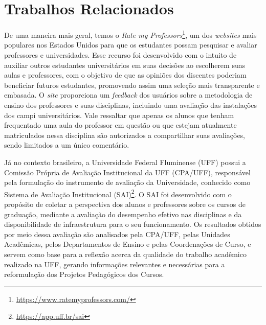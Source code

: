 

\section{Trabalhos Relacionados}
\label{sec:trab_relacionados}

De uma maneira mais geral, temos o 
\textit{Rate my Professors}\footnote{\url{https://www.ratemyprofessors.com/}}, 
um dos \textit{websites} mais populares nos Estados Unidos para que os estudantes possam pesquisar e avaliar professores e universidades. Esse recurso foi desenvolvido com o intuito de auxiliar outros estudantes universitários em suas decisões ao escolherem suas aulas e professores, com o objetivo de que as opiniões dos discentes poderiam beneficiar futuros estudantes, promovendo assim uma seleção mais transparente e embasada. O \textit{site} proporciona um \textit{feedback} dos usuários sobre a metodologia de ensino dos professores e suas disciplinas, incluindo uma avaliação das instalações dos campi universitários. Vale ressaltar que apenas os alunos que tenham frequentado uma aula do professor em questão ou que estejam atualmente matriculados nessa disciplina são autorizados a compartilhar suas avaliações, sendo limitados a um único comentário.


Já no contexto brasileiro, a Universidade Federal Fluminense (UFF) possui a Comissão Própria de Avaliação Institucional da UFF (CPA/UFF),
responsável pela formulação do instrumento de avaliação da Universidade, conhecido como Sistema de Avaliação Institucional (SAI)\footnote{\url{https://app.uff.br/sai}}.
O SAI foi desenvolvido com o propósito de coletar a perspectiva dos alunos e professores sobre os cursos de graduação,
mediante a avaliação do desempenho efetivo nas disciplinas e da disponibilidade de infraestrutura para o seu funcionamento.
Os resultados obtidos por meio dessa avaliação são analisados pela CPA/UFF, pelas Unidades Acadêmicas, pelos Departamentos de Ensino e pelas Coordenações de Curso,
e servem como base para a reflexão acerca da qualidade do trabalho acadêmico realizado na UFF, gerando informações relevantes e necessárias para a reformulação dos Projetos Pedagógicos dos Cursos.

